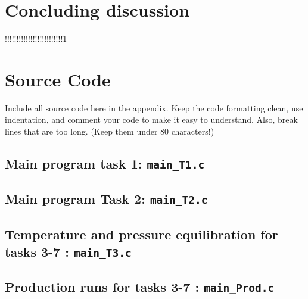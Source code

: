 \section*{Concluding discussion}

!!!!!!!!!!!!!!!!!!!!!!!!!1

\newpage

\appendix

\section{Source Code}

Include all source code here in the appendix. Keep the code formatting clean,
use indentation, and comment your code to make it easy to understand. Also,
break lines that are too long. (Keep them under 80 characters!)

%

%

\subsection{Main program task 1: \texttt{main\_T1.c}}


\subsection{Main program  Task 2: \texttt{main\_T2.c}}


\subsection{Temperature and pressure equilibration for tasks 3-7 : \texttt{main\_T3.c}}


\subsection{Production runs for tasks 3-7 : \texttt{main\_Prod.c}}


